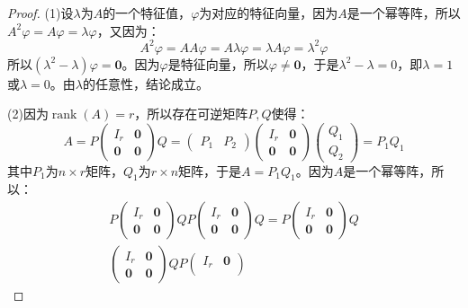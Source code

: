 \begin{proof}
	(1)设$\lambda$为$A$的一个特征值，$\varphi$为对应的特征向量，因为$A$是一个幂等阵，所以$A^2\varphi=A\varphi=\lambda\varphi$，又因为：
	\begin{equation*}
		A^2\varphi=AA\varphi=A\lambda\varphi=\lambda A\varphi=\lambda^2\varphi
	\end{equation*}
	所以$(\lambda^2-\lambda)\varphi=\mathbf{0}$。因为$\varphi$是特征向量，所以$\varphi\ne\mathbf{0}$，于是$\lambda^2-\lambda=0$，即$\lambda=1$或$\lambda=0$。由$\lambda$的任意性，结论成立。\par
	(2)因为$\operatorname{rank}(A)=r$，所以存在可逆矩阵$P,Q$使得：
	\begin{equation*}
		A=P
		\begin{pmatrix}
			I_r & \mathbf{0} \\
			\mathbf{0} & \mathbf{0}
		\end{pmatrix}Q=
		\begin{pmatrix}
			P_1 & P_2
		\end{pmatrix}
		\begin{pmatrix}
			I_r & \mathbf{0} \\
			\mathbf{0} & \mathbf{0}
		\end{pmatrix}
		\begin{pmatrix}
			Q_1 \\
			Q_2
		\end{pmatrix}=P_1Q_1
	\end{equation*}
	其中$P_1$为$n\times r$矩阵，$Q_1$为$r\times n$矩阵，于是$A=P_1Q_1$。因为$A$是一个幂等阵，所以：
	\begin{gather*}
		P
		\begin{pmatrix}
			I_r & \mathbf{0} \\
			\mathbf{0} & \mathbf{0}
		\end{pmatrix}Q
		P
		\begin{pmatrix}
			I_r & \mathbf{0} \\
			\mathbf{0} & \mathbf{0}
		\end{pmatrix}Q
		=
		P
		\begin{pmatrix}
			I_r & \mathbf{0} \\
			\mathbf{0} & \mathbf{0}
		\end{pmatrix}Q \\
		\begin{pmatrix}
			I_r & \mathbf{0} \\
			\mathbf{0} & \mathbf{0}
		\end{pmatrix}QP
		\begin{pmatrix}
			I_r & \mathbf{0} \\

\end{pmatrix}
\end{gather*}
\end{proof}

